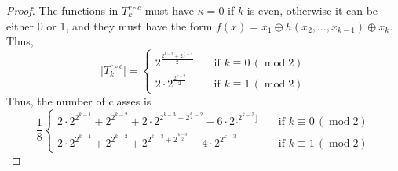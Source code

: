 \documentclass[10pt,a4paper]{amsart}
\begin{document}
\begin{proof}
    The functions in $T^{r \circ c}_k$ must have $\kappa=0$ if $k$ is even, otherwise it can be either 0 or 1, and they must have the form $f(x) = x_1 \oplus h(x_2, \dotsc, x_{k-1}) \oplus x_k$. Thus,
    \[
    \lvert T^{r \circ c}_k\rvert=
    \begin{cases}
        2^{\frac{2^{k-2}+2^{\frac{k}{2}-1}}{2}} &\quad\text{if }k \equiv 0\, (\operatorname{mod} 2)\\
        2 \cdot 2^{\frac{2^{k-2}}{2}} &\quad\text{if }k \equiv 1\, (\operatorname{mod} 2)
    \end{cases}
    \]
    Thus, the number of classes is
    \[
    \frac{1}{8}
    \begin{cases}
        2 \cdot 2^{2^{k-1}} + 2^{2^{k-2}} + 2 \cdot 2^{2^{k-3} + 2^{\frac{k}{2}-2}} - 6 \cdot 2^{\lfloor 2^{k-3} \rfloor} &\quad\text{if }k \equiv 0\, (\operatorname{mod} 2)\\
        2 \cdot 2^{2^{k-1}} + 2^{2^{k-2}} + 2^{2^{k-3} + 2^{\frac{k-3}{2}}} - 4 \cdot 2^{2^{k-3}} &\quad\text{if }k \equiv 1\, (\operatorname{mod} 2)
    \end{cases}
    \]
    \end{proof}
\end{document}
